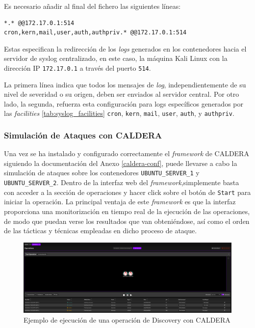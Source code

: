 \newpage

Es necesario añadir al final del fichero las siguientes líneas:

\begin{center}
\begin{mdframed}
\footnotesize
    \begin{verbatim}
*.* @@172.17.0.1:514
cron,kern,mail,user,auth,authpriv.* @@172.17.0.1:514
    \end{verbatim}
\end{mdframed}
\end{center}

Estas especifican la redirección de los \textit{logs} generados en los contenedores hacia el servidor de syslog centralizado, en este caso, la máquina Kali Linux con la dirección \gls{IP} \texttt{172.17.0.1} a través del puerto \texttt{514}. 

La primera línea indica que todos los mensajes de \textit{log}, independientemente de su nivel de severidad o su origen, deben ser enviados al servidor central. Por otro lado, la segunda, refuerza esta configuración para logs específicos generados por las \textit{facilities} \ref{tab:syslog_facilities} \texttt{cron}, \texttt{kern}, \texttt{mail}, \texttt{user}, \texttt{auth}, y \texttt{authpriv}.

\subsubsection*{Simulación de Ataques con \gls{CALDERA}}

Una vez se ha instalado y configurado correctamente el \textit{framework} de \gls{CALDERA} siguiendo la documentación del Anexo \ref{caldera-conf}, puede llevarse a cabo la simulación de ataques sobre los contenedores \texttt{UBUNTU\_SERVER\_1} y \texttt{UBUNTU\_SERVER\_2}. Dentro de la interfaz web del \textit{framework},simplemente basta con acceder a la sección de operaciones y hacer click sobre el botón de \texttt{Start} para iniciar la operación. La principal ventaja de este \textit{framework} es que la interfaz proporciona una monitorización en tiempo real de la ejecución de las operaciones, de modo que puedan verse los resultados que van obteniéndose, así como el orden de las tácticas y técnicas empleadas en dicho proceso de ataque.

\begin{figure}[H]
    \centering
    \includegraphics[width=1\linewidth]{imagenes/operation-start.png}
    \caption{Ejemplo de ejecución de una operación de Discovery con \gls{CALDERA}}
    \label{fig:operation-start}
\end{figure}

